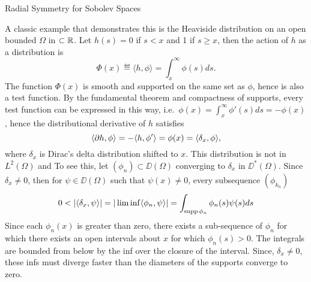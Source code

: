 \begin{chapter}{Radial Symmetry for Sobolev Spaces}
\begin{com}
  A classic example that demonstrates this is the Heaviside distribution on an open bounded $\Omega$ in $\subset \mathbb R$.
  Let $h(s) = 0$ if $s<x$ and 1 if $s\ge x$, then the action of $h$ as a distribution is 
  \begin{equation}
    \Phi(x) \eqdef \langle h, \phi \rangle = \int_x^\infty \phi(s)ds.
  \end{equation}
  The function $\Phi(x)$ is smooth and supported on the same set as $\phi$, hence is also a test function.
  By the fundamental theorem and compactness of supports, every test function can be expressed in this way, i.e.~$\phi(x) = \int_x^\infty \phi'(s)ds = -\phi(x)$, hence the distributional derivative of $h$ satisfies
  \begin{equation}
    \langle \partial h, \phi\rangle = - \langle h, \phi'\rangle = \phi(x) = \langle \delta_x, \phi\rangle,
  \end{equation}
  where $\delta_x$ is Dirac's delta distribution shifted to $x$.
  This distribution is not in $L^2(\Omega)$ and
  To see this, let $(\phi_n) \subset \DD(\Omega)$ converging to $\delta_x$ in $\DD^*(\Omega)$.
  Since $\delta_x \not=0$, then for $\psi \in \DD(\Omega)$ such that $\psi(x) \not= 0$, every subsequence $(\phi_{k_n})$ 
  \begin{equation}
    0 < |\langle \delta_x,\psi\rangle| = |\liminf \langle \phi_n,\psi \rangle| = \int_{\operatorname*{supp} \phi_n} \phi_n(s)\psi(s)ds
  \end{equation}
  Since each $\phi_n(x)$ is greater than zero, there exists a sub-sequence of $\phi_n$ for which there exists an open intervals about $x$ for which $\phi_n(s)>0$.
  The integrals are bounded from below by the inf over the closure of the interval.
  Since, $\delta_x \not= 0$, these infs must diverge faster than the diameters of the supports converge to zero.
\end{com}


\end{chapter}
